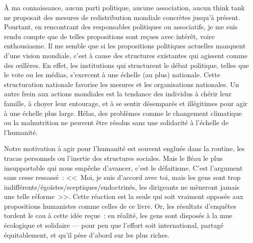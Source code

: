 \documentclass[a5paper,french,openany]{memoir}
\begin{document}
À ma connaissance, aucun parti politique, aucune association, aucun think tank ne proposait des mesures de redistribution mondiale concrètes jusqu'à présent. Pourtant, en rencontrant des responsables politiques ou associatifs, je me suis rendu compte que de telles propositions sont reçues avec intérêt, voire enthousiasme. Il me semble que si les propositions politiques actuelles manquent d'une vision mondiale, c'est à cause des structures existantes qui agissent comme des œillères. En effet, les institutions qui structurent le débat politique, telles que le vote ou les médias, s'exercent à une échelle (au plus) nationale. Cette structuration nationale favorise les mesures et les organisations nationales. Un autre frein aux actions mondiales est la tendance des individus à chérir leur famille, à choyer leur entourage, et à se sentir désemparés et illégitimes pour agir à une échelle plus large. %
Hélas, des problèmes comme le changement climatique ou la malnutrition ne peuvent être résolus sans une solidarité à l'échelle de l'humanité. 

Notre motivation à agir pour l'humanité est souvent engluée dans la routine, les tracas personnels ou l'inertie des structures sociales. %
Mais le fléau le plus insupportable qui nous empêche d'avancer, c'est le défaitisme. C'est l'argument sans cesse ressassé~: <<~Moi, je suis d'accord avec toi, mais les gens sont trop indifférents/égoïstes/sceptiques/endoctrinés, les dirigeants ne mèneront jamais une telle réforme~>>. Cette réaction est la seule qui soit vraiment opposée aux propositions humanistes comme celles de ce livre. %
Or, les résultats d'enquêtes tordent le cou à cette idée reçue~: en réalité, les gens sont disposés à la mue écologique et solidaire --- pour peu que l'effort soit international, partagé équitablement, et qu'il pèse d'abord sur les plus riches. %

\end{document}
